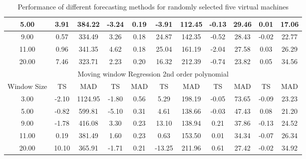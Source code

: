 \documentclass[conference,onecolumn]{IEEEtran}
\begin{document}
\begin{table}[ht]
\begin{tabular}{|c|c|c|c|c|c|c|c|c|c|c|}
5.00        & 3.91             & 384.22           & -3.24              & 0.19            & -3.91           & 112.45         & -0.13            & 29.46           & 0.01             & 17.06            \\ \hline
9.00        & 0.57             & 334.49           & 3.26               & 0.18            & 24.87           & 142.35         & -0.52            & 28.43           & -0.02            & 22.77            \\ \hline
11.00       & 0.96             & 341.35           & 4.62               & 0.18            & 25.04           & 161.19         & -2.04            & 27.58           & 0.03             & 26.29            \\ \hline
20.00       & 7.46             & 323.71           & 2.23               & 0.20            & 16.32           & 212.39         & -0.74            & 23.82           & 0.05             & 34.56            \\ \hline
\multicolumn{11}{|c|}{Moving window Regression 2nd order polynomial}                                                                                                                                   \\ \hline
Window Size & TS               & MAD              & TS                 & MAD             & TS              & MAD            & TS               & MAD             & TS               & MAD              \\ \hline
3.00        & -2.10            & 1124.95          & -1.80              & 0.56            & 5.29            & 198.19         & -0.05            & 73.65           & -0.09            & 23.23            \\ \hline
5.00        & -0.82            & 599.81           & -5.10              & 0.31            & 4.61            & 138.66         & -0.03            & 47.43           & 0.08             & 21.20            \\ \hline
9.00        & -1.78            & 416.08           & 3.30               & 0.23            & 13.10           & 138.94         & 0.21             & 37.86           & -0.13            & 24.52            \\ \hline
11.00       & 0.19             & 381.49           & 1.60               & 0.23            & 0.63            & 153.50         & 0.01             & 34.34           & -0.07            & 26.34            \\ \hline
20.00       & 10.10            & 365.91           & -1.71              & 0.21            & -13.25          & 211.96         & 0.61             & 27.42           & -0.02            & 34.92            \\ \hline
\end{tabular}
\caption{Performance of different forecasting methods for randomly selected five virtual machines}
\label{table:results}
\end{table}
\end{document}
